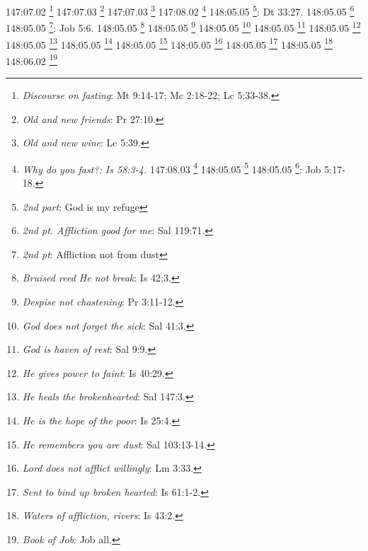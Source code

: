 {{{{{{{{{{{{{{{{{{{{{{{{{{{{{{147:07.02 \footnote{\textit{Discourse on fasting}: Mt 9:14-17; Mc 2:18-22; Lc 5:33-38.}
147:07.03 \footnote{\textit{Old and new friends}: Pr 27:10.}
147:07.03 \footnote{\textit{Old and new wine}: Lc 5:39.}
147:08.02 \footnote{\textit{Why do you fast?: Is 58:3-4.}
147:08.03 \footnote{\textit{Why not do good?: Is 58:5-7.}
147:08.04 \footnote{\textit{Light break forth}: Is 58:8-12.}
147:08.05 \footnote{\textit{Grow in grace}: 2 P 3:18.}
148:04.01 \footnote{\textit{Why must we be born of the spirit?: Jn 3:3-6.}
148:04.07 \footnote{\textit{Cain takes wife from Nod}: Gn 4:16-17.}
148:04.07 \footnote{\textit{Sons of God take wives}: Gn 6:1-2.}
148:04.07 \footnote{\textit{The so-called fall of man}: Gn 3:17-19; Ro 5:12-19.}
148:04.08 \footnote{\textit{Evil by nature, not sinful}: Ec 7:20; Ro 3:23; 1 Jn 1:8.}
148:04.09 \footnote{\textit{Greeks}: man is falling}: Ro 5:12-19.}
148:04.10 \footnote{\textit{I created them for my glory}: Is 43:6-7.}
148:04.10 \footnote{\textit{I have chosen him my son}: 1 Cr 28:6.}
148:04.10 \footnote{\textit{I will be Father, he will be son}: 2 Sam 7:14.}
148:04.10 \footnote{\textit{Those with spirit, sons of God}: Ro 8:14.}
148:04.10 \footnote{\textit{You are God's children}: Sal 82:6.}
148:04.10 \footnote{\textit{You are sons of living God}: Os 1:10.}
148:05.03 \footnote{\textit{No purposeful affliction}: Heb 12:5-11.}
148:05.05 \footnote{\textit{1st part}: I know your sorrows}: Ex 3:7.}
148:05.05 \footnote{\textit{1st pt. Before afflicted, strayed}: Sal 119:67.}
148:05.05 \footnote{\textit{1st pt}: Correction in suffering}: Job 5:17-18.}
148:05.05 \footnote{\textit{2nd part}: God is my refuge}: Dt 33:27.}
148:05.05 \footnote{\textit{2nd pt. Affliction good for me}: Sal 119:71.}
148:05.05 \footnote{\textit{2nd pt}: Affliction not from dust}: Job 5:6.}
148:05.05 \footnote{\textit{Bruised reed He not break}: Is 42:3.}
148:05.05 \footnote{\textit{Despise not chastening}: Pr 3:11-12.}
148:05.05 \footnote{\textit{God does not forget the sick}: Sal 41:3.}
148:05.05 \footnote{\textit{God is haven of rest}: Sal 9:9.}
148:05.05 \footnote{\textit{He gives power to faint}: Is 40:29.}
148:05.05 \footnote{\textit{He heals the brokenhearted}: Sal 147:3.}
148:05.05 \footnote{\textit{He is the hope of the poor}: Is 25:4.}
148:05.05 \footnote{\textit{He remembers you are dust}: Sal 103:13-14.}
148:05.05 \footnote{\textit{Lord does not afflict willingly}: Lm 3:33.}
148:05.05 \footnote{\textit{Sent to bind up broken hearted}: Is 61:1-2.}
148:05.05 \footnote{\textit{Waters of affliction, rivers}: Is 43:2.}
148:06.02 \footnote{\textit{Book of Job}: Job all.}
}}}}}}}}}}}}}}}}}}}}}}}}}}}}

